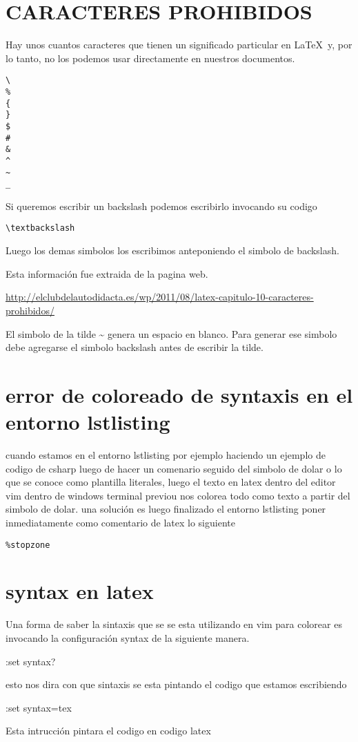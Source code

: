 \section{CARACTERES PROHIBIDOS}

Hay unos cuantos caracteres que tienen un
significado particular en \LaTeX~y, por lo tanto,
no los podemos usar directamente en nuestros documentos.

\begin{verbatim}
\
%
{
}
$
#
&
^
~
_
\end{verbatim}

Si queremos escribir un backslash podemos escribirlo invocando su codigo

\begin{verbatim}
\textbackslash
\end{verbatim}

Luego los demas simbolos los escribimos anteponiendo el simbolo de backslash.

Esta información fue extraida de la pagina web.

\url{http://elclubdelautodidacta.es/wp/2011/08/latex-capitulo-10-caracteres-prohibidos/}

El simbolo de la tilde \~{} genera un espacio en blanco. Para generar ese simbolo
debe agregarse el simbolo backslash antes de escribir la tilde.

\section{error de coloreado de syntaxis en el entorno lstlisting}

cuando estamos en el entorno lstlisting por ejemplo haciendo un ejemplo de
codigo de csharp luego de hacer un comenario seguido del simbolo de dolar o lo que
se conoce como plantilla literales, luego el texto en latex dentro del
editor vim dentro de windows terminal previou nos colorea todo como texto
a partir del simbolo de dolar. una solución es luego finalizado el entorno
lstlisting poner inmediatamente como comentario de latex lo siguiente

\begin{verbatim}
%stopzone
\end{verbatim}

\section{syntax en latex}

Una forma de saber la sintaxis que se se esta utilizando en vim para colorear
es invocando la configuración syntax de la siguiente manera.

:set syntax?

esto nos dira con que sintaxis se esta pintando el codigo que estamos
escribiendo

:set syntax=tex

Esta intrucción pintara el codigo en codigo latex
